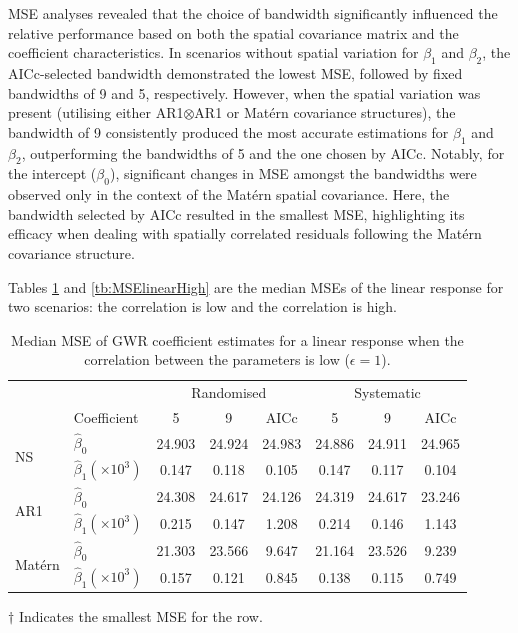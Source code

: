 \documentclass[a4paper]{article} 	%
\newcommand{\Matern}{Mat\'ern }
\begin{document}
MSE analyses revealed that the choice of bandwidth significantly influenced the relative performance based on both the spatial covariance matrix and the coefficient characteristics. In scenarios without spatial variation for $\beta_1$ and $\beta_2$, the AICc-selected bandwidth demonstrated the lowest MSE, followed by fixed bandwidths of 9 and 5, respectively. However, when the spatial variation was present (utilising either AR1$\otimes$AR1 or \Matern covariance structures), the bandwidth of 9 consistently produced the most accurate estimations for $\beta_1$ and $\beta_2$, outperforming the bandwidths of 5 and the one chosen by AICc. Notably, for the intercept ($\beta_0$), significant changes in MSE amongst the bandwidths were observed only in the context of the \Matern spatial covariance. Here, the bandwidth selected by AICc resulted in the smallest MSE, highlighting its efficacy when dealing with spatially correlated residuals following the \Matern covariance structure. 

Tables \ref{tb:MSElinear} and \ref{tb:MSElinearHigh} are the median MSEs of the linear response for two scenarios: the correlation is low and the correlation is high.

\begin{table}[!htp]
	\centering
\begin{threeparttable}
	\caption{Median MSE of GWR coefficient estimates for a linear response when the correlation between the parameters is low ($\epsilon=1$).}\label{tb:MSElinear}
	\begin{tabular}{llcccccc}
		\toprule
		&  & \multicolumn{3}{c}{Randomised} & \multicolumn{3}{c}{Systematic} \\ 
   		 & Coefficient & 5  &  9  & AICc & 5   & 9  & AICc \\ \midrule
		\multirow{2}{*}{NS}   & $\hat{\beta}_0$ & 24.903 &	24.924 &	24.983&	24.886\tnote{$\dagger$} &	24.911 &	24.965 \\ 
		& $\hat{\beta}_1 (\times 10^3)$ & 0.147&	0.118&	0.105&	0.147&	0.117&	0.104\tnote{$\dagger$}  \\  \midrule
		\multirow{2}{*}{AR1}  & $\hat{\beta}_0$ & 24.308&	24.617&	24.126&	24.319&	24.617&	23.246\tnote{$\dagger$}  \\ 
		& $\hat{\beta}_1 (\times 10^3)$ & 0.215	&0.147	&1.208&	0.214&	0.146\tnote{$\dagger$}	&1.143 \\ \midrule
		\multirow{2}{*}{\Matern} & $\hat{\beta}_0$ & 21.303	&23.566	&9.647&	21.164&	23.526&	9.239\tnote{$\dagger$} \\ 
		& $\hat{\beta}_1 (\times 10^3)$ & 0.157	&0.121&	0.845&	0.138&	0.115\tnote{$\dagger$} &	0.749 \\
		\bottomrule
	\end{tabular}
	\begin{tablenotes}
	\item[$\dagger$] \footnotesize Indicates the smallest MSE for the row.
	\end{tablenotes}
\end{threeparttable}
\end{table}
\end{document}
